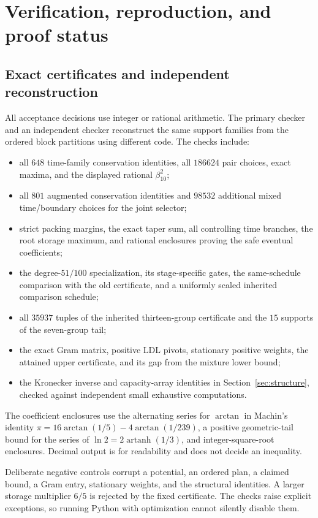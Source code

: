 \section{Verification, reproduction, and proof status}
\label{sec:verification}

\subsection{Exact certificates and independent reconstruction}

All acceptance decisions use integer or rational arithmetic. The primary
checker and an independent checker reconstruct the same support families
from the ordered block partitions using different code. The checks include:
\begin{itemize}
\item all $648$ time-family conservation identities, all $186624$ pair
choices, exact maxima, and the displayed rational $\beta_{10}^2$;
\item all $801$ augmented conservation identities and $98532$ additional
mixed time/boundary choices for the joint selector;
\item strict packing margins, the exact taper sum, all controlling time
branches, the root storage maximum, and rational enclosures proving the
safe eventual coefficients;
\item the degree-$51/100$ specialization, its stage-specific gates, the
same-schedule comparison with the old certificate, and a uniformly scaled
inherited comparison schedule;
\item all $35937$ tuples of the inherited thirteen-group certificate and
the $15$ supports of the seven-group tail;
\item the exact Gram matrix, positive LDL pivots, stationary positive
weights, the attained upper certificate, and its gap from the mixture
lower bound;
\item the Kronecker inverse and capacity-array identities in
Section~\ref{sec:structure}, checked against independent small exhaustive
computations.
\end{itemize}

The coefficient enclosures use the alternating series for $\arctan$ in
Machin's identity $\pi=16\arctan(1/5)-4\arctan(1/239)$, a positive
geometric-tail bound for the series of $\ln2=2\operatorname{artanh}(1/3)$,
and integer-square-root enclosures. Decimal output is for readability and
does not decide an inequality.

Deliberate negative controls corrupt a potential, an ordered plan, a
claimed bound, a Gram entry, stationary weights, and the structural
identities. A larger storage multiplier $6/5$ is rejected by the fixed
certificate. The checks raise explicit exceptions, so running Python
with optimization cannot silently disable them.

